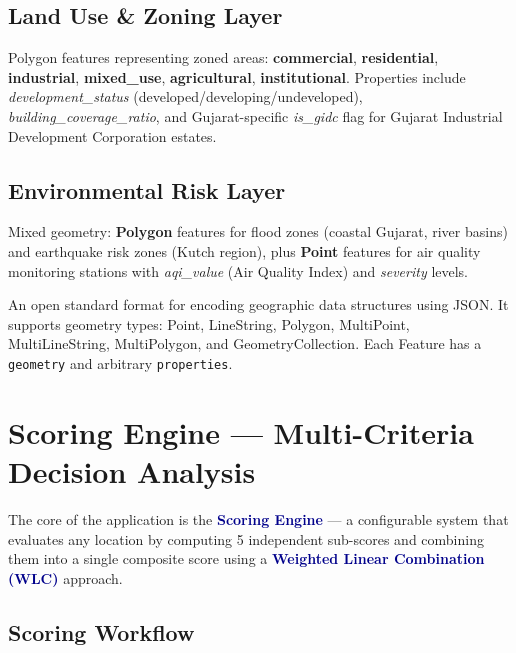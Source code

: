 \documentclass[12pt, a4paper]{article}
\newcommand{\concept}[1]{\textbf{\textcolor{darkblue}{#1}}}
\begin{document}
\subsection{Land Use \& Zoning Layer}

Polygon features representing zoned areas: \textbf{commercial}, \textbf{residential},
\textbf{industrial}, \textbf{mixed\_use}, \textbf{agricultural}, \textbf{institutional}.
Properties include \textit{development\_status} (developed/developing/undeveloped),
\textit{building\_coverage\_ratio}, and Gujarat-specific \textit{is\_gidc} flag for
Gujarat Industrial Development Corporation estates.

\subsection{Environmental Risk Layer}

Mixed geometry: \textbf{Polygon} features for flood zones (coastal Gujarat, river basins)
and earthquake risk zones (Kutch region), plus \textbf{Point} features for air quality
monitoring stations with \textit{aqi\_value} (Air Quality Index) and \textit{severity} levels.

\begin{conceptbox}
    An open standard format for encoding geographic data structures using JSON.
    It supports geometry types: Point, LineString, Polygon, MultiPoint, MultiLineString,
    MultiPolygon, and GeometryCollection. Each Feature has a \texttt{geometry} and
    arbitrary \texttt{properties}.
\end{conceptbox}

\newpage

\section{Scoring Engine — Multi-Criteria Decision Analysis}

The core of the application is the \concept{Scoring Engine} — a configurable system that
evaluates any location by computing 5 independent sub-scores and combining them into a
single composite score using a \concept{Weighted Linear Combination (WLC)} approach.

\subsection{Scoring Workflow}
\end{document}
